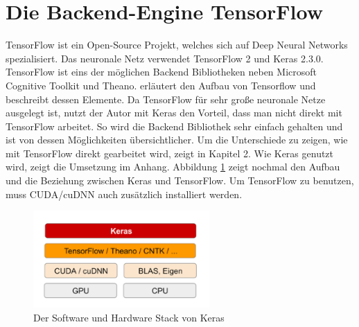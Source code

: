 \section{Die Backend-Engine TensorFlow}
\label{sec:tens}
TensorFlow ist ein Open-Source Projekt, welches sich auf Deep Neural Networks spezialisiert. Das neuronale Netz verwendet TensorFlow 2 und Keras 2.3.0. TensorFlow ist eins der möglichen Backend Bibliotheken neben Microsoft Cognitive Toolkit und Theano. \citep{goldsborough2016tour} erläutert den Aufbau von Tensorflow und beschreibt dessen Elemente. Da TensorFlow für sehr große neuronale Netze ausgelegt ist, nutzt der Autor mit Keras den Vorteil, dass man nicht direkt mit TensorFlow arbeitet. So wird die Backend Bibliothek sehr einfach gehalten und ist von dessen Möglichkeiten übersichtlicher. Um die Unterschiede zu zeigen, wie mit TensorFlow direkt gearbeitet wird, zeigt \citep{santanu2017} in Kapitel 2. Wie Keras genutzt wird, zeigt die Umsetzung im Anhang. Abbildung \ref{fig:stack} zeigt nochmal den Aufbau und die Beziehung zwischen Keras und TensorFlow. Um TensorFlow zu benutzen, muss CUDA/cuDNN auch zusätzlich installiert werden. 

\begin{figure}[H]
	\centering
		\includegraphics[width=0.6\textwidth]{images/dl_soft_hard.png}
	\caption{Der Software und Hardware Stack von Keras \citep{chollet2018}}
	\label{fig:stack}
\end{figure}

